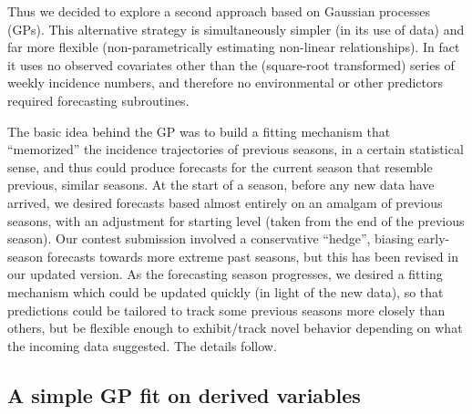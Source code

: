 \documentclass[12pt]{article}
\begin{document}
Thus we decided to explore a second approach based on Gaussian processes
(GPs). This alternative strategy is simultaneously simpler (in its use of
data) and far more flexible (non-parametrically estimating non-linear
relationships). In fact it uses no observed covariates other than the
(square-root transformed) series of weekly incidence numbers, and therefore no
environmental or other predictors required forecasting subroutines.

The basic idea behind the GP was to build a fitting mechanism that
``memorized'' the incidence trajectories of previous seasons, in a certain
statistical sense, and thus could produce forecasts for the current season
that resemble previous, similar seasons. At the start of a season, before any
new data have arrived, we desired forecasts based almost entirely on an
amalgam of previous seasons, with an adjustment for starting level (taken from
the end of the previous season).  Our contest submission involved a
conservative ``hedge'', biasing early-season forecasts towards more extreme
past seasons, but this has been revised in our updated version. As the
forecasting season progresses, we desired a fitting mechanism which could be
updated quickly (in light of the new data), so that predictions could be
tailored to track some previous seasons more closely than others, but be
flexible enough to exhibit/track novel behavior depending on what the incoming
data suggested. The details follow.

\subsection{A simple GP fit on derived variables}
\label{sec:simplegp}
\end{document}
